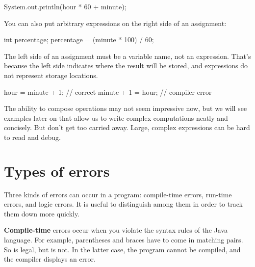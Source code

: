 \begin{code}
System.out.println(hour * 60 + minute);
\end{code}

You can also put arbitrary expressions on the right side of an assignment:

\begin{code}
int percentage;
percentage = (minute * 100) / 60;
\end{code}

The left side of an assignment must be a variable name, not an expression.
That's because the left side indicates where the result will be stored, and expressions do not represent storage locations.

\begin{code}
hour = minute + 1;  // correct
minute + 1 = hour;  // compiler error
\end{code}


The ability to compose operations may not seem impressive now, but we will see examples later on that allow us to write complex computations neatly and concisely.
But don't get too carried away.
Large, complex expressions can be hard to read and debug.



\section{Types of errors}


Three kinds of errors can occur in a program: compile-time errors, run-time errors, and logic errors.
It is useful to distinguish among them in order to track them down more quickly.


{\bf Compile-time} errors occur when you violate the syntax rules of the Java language.
For example, parentheses and braces have to come in matching pairs.
So  is legal, but  is not.
In the latter case, the program cannot be compiled, and the compiler displays an error.

